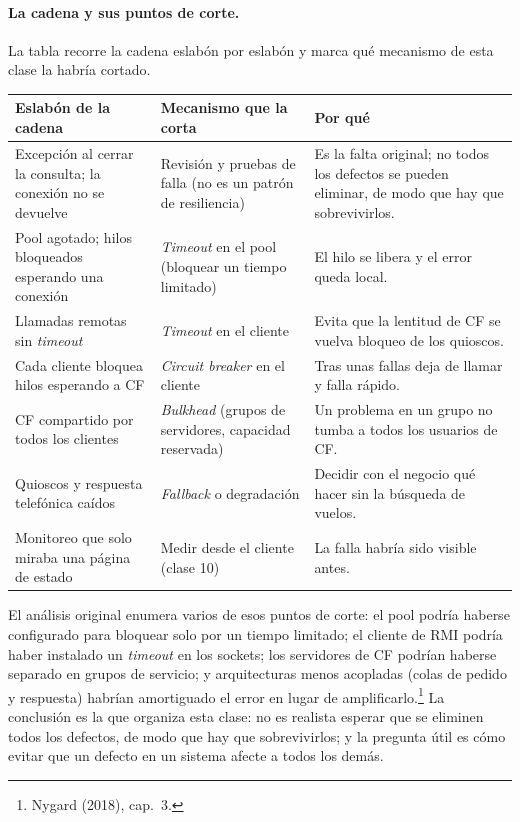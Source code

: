 \documentclass[variant=apuntes,cover=institutional,mode=screen]{ua-engineering-v6-article}
\begin{document}
\paragraph{La cadena y sus puntos de corte.} La tabla recorre la cadena eslabón por eslabón y marca qué mecanismo de esta clase la habría cortado.

\begin{center}
\begin{tabular}{p{}p{}p{}}
\toprule
\textbf{Eslabón de la cadena} & \textbf{Mecanismo que la corta} & \textbf{Por qué} \\
\midrule
Excepción al cerrar la consulta; la conexión no se devuelve & Revisión y pruebas de falla (no es un patrón de resiliencia) & Es la falta original; no todos los defectos se pueden eliminar, de modo que hay que sobrevivirlos. \\
Pool agotado; hilos bloqueados esperando una conexión & \emph{Timeout} en el pool (bloquear un tiempo limitado) & El hilo se libera y el error queda local. \\
Llamadas remotas sin \emph{timeout} & \emph{Timeout} en el cliente & Evita que la lentitud de CF se vuelva bloqueo de los quioscos. \\
Cada cliente bloquea hilos esperando a CF & \emph{Circuit breaker} en el cliente & Tras unas fallas deja de llamar y falla rápido. \\
CF compartido por todos los clientes & \emph{Bulkhead} (grupos de servidores, capacidad reservada) & Un problema en un grupo no tumba a todos los usuarios de CF. \\
Quioscos y respuesta telefónica caídos & \emph{Fallback} o degradación & Decidir con el negocio qué hacer sin la búsqueda de vuelos. \\
Monitoreo que solo miraba una página de estado & Medir desde el cliente (clase 10) & La falla habría sido visible antes. \\
\bottomrule
\end{tabular}
\end{center}

El análisis original enumera varios de esos puntos de corte: el pool podría haberse configurado para bloquear solo por un tiempo limitado; el cliente de RMI podría haber instalado un \emph{timeout} en los sockets; los servidores de CF podrían haberse separado en grupos de servicio; y arquitecturas menos acopladas (colas de pedido y respuesta) habrían amortiguado el error en lugar de amplificarlo.\footnote{Nygard (2018), cap.~3.} La conclusión es la que organiza esta clase: no es realista esperar que se eliminen todos los defectos, de modo que hay que sobrevivirlos; y la pregunta útil es cómo evitar que un defecto en un sistema afecte a todos los demás.
\end{document}
